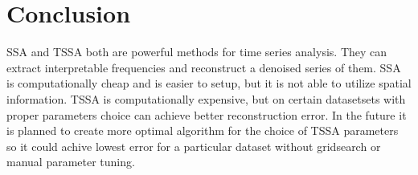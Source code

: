 \documentclass{article}
\begin{document}


% 
% 

\section{Conclusion}

SSA and TSSA both are powerful methods for time series analysis. They can extract interpretable frequencies and reconstruct a denoised series of them. SSA is computationally cheap and is easier to setup, but it is not able to utilize spatial information. TSSA is computationally expensive, but on certain datasetsets with proper parameters choice can achieve better reconstruction error. In the future it is planned to create more optimal algorithm for the choice of TSSA parameters so it could achive lowest error for a particular dataset without gridsearch or manual parameter tuning.

\nocite{*}


\end{document}
